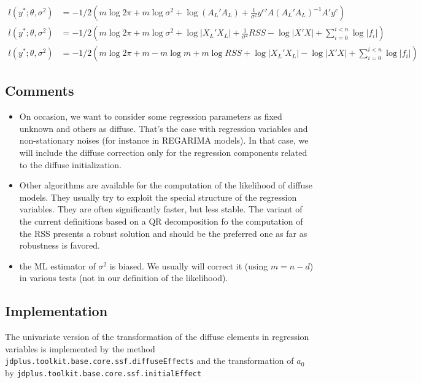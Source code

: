\documentclass[
  letterpaper,
  DIV=11,
  numbers=noendperiod]{scrreprt}
\providecommand{\tightlist}{%
  \setlength{\itemsep}{0pt}\setlength{\parskip}{0pt}}
\begin{document}
\[
\begin{align*}
l(y^*; \theta, \sigma^2) &= -1/2\left(m \log 2\pi + m \log \sigma^2 + \log({A_L}'A_L)  + \frac{1}{\sigma^2}{y^c}'A({A_L}'A_L)^{-1}A'y^c\right) \\
l(y^*; \theta, \sigma^2) &= -1/2\left(m \log 2\pi + m \log \sigma^2 + \log \vert {X_L}'X_L \vert +\frac{1}{\sigma^2} RSS  - \log \vert X'X \vert  +  \sum_{i=0}^{i<n} {\log \vert f_i \vert }\right) \\
l(y^*; \theta, \sigma^2) &= -1/2\left(m \log 2\pi + m - m \log m + m \log RSS + \log \vert {X_L}' X_L \vert - \log \vert X'X \vert + \sum_{i=0}^{i<n} {\log \vert f_i \vert } \right)
\end{align*}
\]

\subsection{Comments}\label{comments}

\begin{itemize}
\tightlist
\item
  On occasion, we want to consider some regression parameters as fixed
  unknown and others as diffuse. That's the case with regression
  variables and non-stationary noises (for instance in REGARIMA models).
  In that case, we will include the diffuse correction only for the
  regression components related to the diffuse initialization.
\item
  Other algorithms are available for the computation of the likelihood
  of diffuse models. They usually try to exploit the special structure
  of the regression variables. They are often significantly faster, but
  less stable. The variant of the current definitions based on a QR
  decomposition fo the computation of the RSS presents a robust solution
  and should be the preferred one as far as robustness is favored.
\item
  the ML estimator of \(\sigma^2\) is biased. We usually will correct it
  (using \(m=n - d\)) in various tests (not in our definition of the
  likelihood).
\end{itemize}

\subsection{Implementation}\label{implementation-4}

The univariate version of the transformation of the diffuse elements in
regression variables is implemented by the method
\texttt{jdplus.toolkit.base.core.ssf.diffuseEffects} and the
transformation of \(a_0\) by
\texttt{jdplus.toolkit.base.core.ssf.initialEffect}
\end{document}

